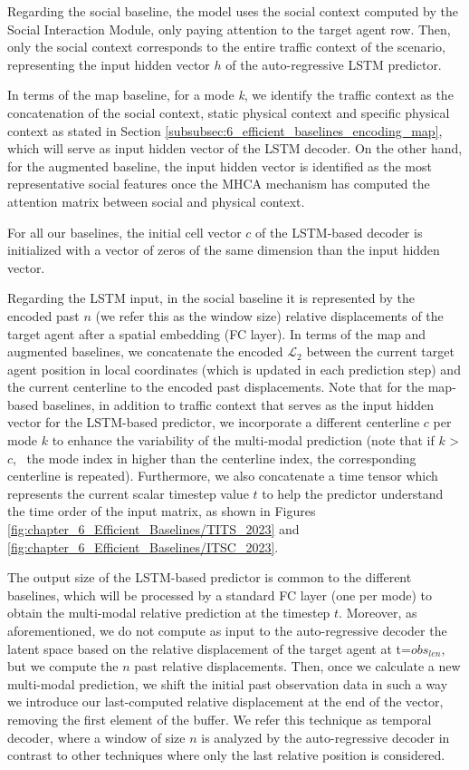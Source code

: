 Regarding the social baseline, the model uses the social context computed by the Social Interaction Module, only paying attention to the target agent row. Then, only the social context corresponds to the entire traffic context of the scenario, representing the input hidden vector $h$ of the auto-regressive \ac{LSTM} predictor. 

In terms of the map baseline, for a mode \textit{k}, we identify the traffic context as the concatenation of the social context, static physical context and specific physical context as stated in Section \ref{subsubsec:6_efficient_baselines_encoding_map}, which will serve as input hidden vector of the \ac{LSTM} decoder. On the other hand, for the augmented baseline, the input hidden vector is identified as the most representative social features once the \ac{MHCA} mechanism has computed the attention matrix between social and physical context. 

For all our baselines, the initial cell vector $c$ of the \ac{LSTM}-based decoder is initialized with a vector of zeros of the same dimension than the input hidden vector. 

Regarding the \ac{LSTM} input, in the social baseline it is represented by the encoded past $n$ (we refer this as the window size) relative displacements of the target agent after a spatial embedding (\ac{FC} layer). In terms of the map and augmented baselines, we concatenate the encoded $\mathcal{L}_2$ between the current target agent position in local coordinates (which is updated in each prediction step) and the current centerline to the encoded past displacements. Note that for the map-based baselines, in addition to traffic context that serves as the input hidden vector for the \ac{LSTM}-based predictor, we incorporate a different centerline $c$ per mode $k$ to enhance the variability of the multi-modal prediction (note that if $k$ > $c$, \ie \ the mode index in higher than the centerline index, the corresponding centerline is repeated). Furthermore, we also concatenate a time tensor which represents the current scalar timestep value $t$ to help the predictor understand the time order of the input matrix, as shown in Figures \ref{fig:chapter_6_Efficient_Baselines/TITS_2023} and \ref{fig:chapter_6_Efficient_Baselines/ITSC_2023}.

The output size of the \ac{LSTM}-based predictor is common to the different baselines, which will be processed by a standard \ac{FC} layer (one per mode) to obtain the multi-modal relative prediction at the timestep $t$. Moreover, as aforementioned, we do not compute as input to the auto-regressive decoder the latent space based on the relative displacement of the target agent at t=$obs_{len}$, but we compute the $n$ past relative displacements. Then, once we calculate a new multi-modal prediction, we shift the initial past observation data in such a way we introduce our last-computed relative displacement at the end of the vector, removing the first element of the buffer. We refer this technique as temporal decoder, where a window of size $n$ is analyzed by the auto-regressive decoder in contrast to other techniques \cite{dendorfer2020goal, sadeghian2019sophie, gupta2018social} where only the last relative position is considered. 

